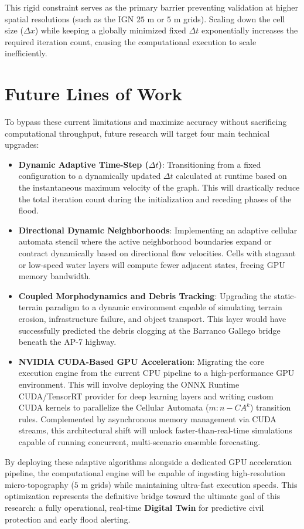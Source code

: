 This rigid constraint serves as the primary barrier preventing validation at higher spatial resolutions (such as the IGN $25\text{ m}$ or 
$5\text{ m}$ grids). Scaling down the cell size ($\Delta x$) while keeping a globally minimized fixed $\Delta t$ exponentially increases the 
required iteration count, causing the computational execution to scale inefficiently.


\section{Future Lines of Work}
\label{section:future_lines_of_work}

To bypass these current limitations and maximize accuracy without sacrificing computational throughput, future research will target four 
main technical upgrades:

\begin{itemize}
    \item \textbf{Dynamic Adaptive Time-Step ($\Delta t$)}: Transitioning from a fixed configuration to a dynamically updated $\Delta t$ 
    calculated at runtime based on the instantaneous maximum velocity of the graph. This will drastically reduce the total iteration count 
    during the initialization and receding phases of the flood.
    
    \item \textbf{Directional Dynamic Neighborhoods}: Implementing an adaptive cellular automata stencil where the active neighborhood 
    boundaries expand or contract dynamically based on directional flow velocities. Cells with stagnant or low-speed water layers will 
    compute fewer adjacent states, freeing GPU memory bandwidth.
    
    \item \textbf{Coupled Morphodynamics and Debris Tracking}: Upgrading the static-terrain paradigm to a dynamic environment capable of 
    simulating terrain erosion, infrastructure failure, and object transport. This layer would have successfully predicted the debris 
    clogging at the Barranco Gallego bridge beneath the AP-7 highway.
    
    \item \textbf{NVIDIA CUDA-Based GPU Acceleration}: Migrating the core execution engine from the current CPU pipeline to a 
    high-performance GPU environment. This will involve deploying the ONNX Runtime CUDA/TensorRT provider for deep learning layers and 
    writing custom CUDA kernels to parallelize the Cellular Automata ($m:n-CA^k$) transition rules. Complemented by asynchronous 
    memory management via CUDA streams, this architectural shift will unlock faster-than-real-time simulations capable of running 
    concurrent, multi-scenario ensemble forecasting.
\end{itemize}

By deploying these adaptive algorithms alongside a dedicated GPU acceleration pipeline, the computational engine will be capable of 
ingesting high-resolution micro-topography ($5\text{ m}$ grids) while maintaining ultra-fast execution speeds. This optimization 
represents the definitive bridge toward the ultimate goal of this research: a fully operational, real-time \textbf{Digital Twin} for predictive 
civil protection and early flood alerting.